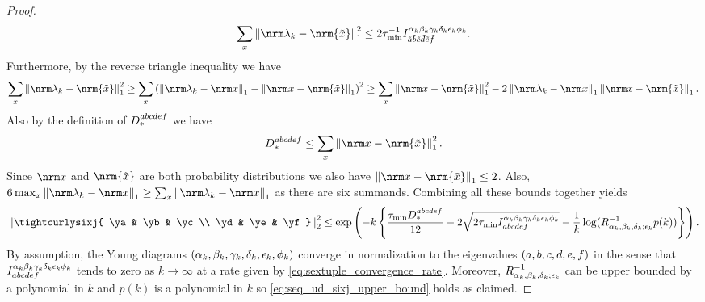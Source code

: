 \documentclass[notitlepage, 10pt]{article}
\begin{document}
\begin{proof}
    \begin{equation}
        \sum_{\ex} \norm{\nrm \yx_k - \nrm {\tilde \ex}}_{1}^2 \leq 2 \tau_{\min}^{-1}I^{\ya_k\yb_k\yc_k\yd_k\ye_k\yf_k}_{\tilde \ea \tilde \eb\tilde \ec\tilde \ed\tilde \ee\tilde \ef}.
    \end{equation}
    Furthermore, by the reverse triangle inequality we have
    \begin{align}
        \sum_{\ex} \norm{\nrm \yx_k - \nrm {\tilde \ex}}_{1}^2
        \geq
        \sum_{\ex}\left(\norm{\nrm \yx_k - \nrm \ex}_{1}
        -\norm{\nrm \ex - \nrm {\tilde \ex}}_{1}\right)^2
        \geq
        \sum_{\ex}\norm{\nrm \ex - \nrm {\tilde \ex}}_{1}^2 -2\norm{\nrm \yx_k - \nrm \ex}_{1}\norm{\nrm \ex - \nrm {\tilde \ex}}_{1}.
    \end{align}
    Also by the definition of $D_{*}^{abcdef}$ we have
    \begin{equation}
        D_{*}^{\ea\eb\ec\ed\ee\ef} \leq \sum_{\ex}\norm{\nrm \ex - \nrm {\tilde \ex}}_{1}^2.
    \end{equation}
    Since $\nrm \ex$ and $\nrm {\tilde \ex}$ are both probability distributions we also have $\norm{\nrm \ex - \nrm {\tilde \ex}}_{1} \leq 2$.
    Also, $6 \max_{\ex}\norm{\nrm \yx_k - \nrm \ex}_{1} \geq \sum_{\ex}\norm{\nrm \yx_k - \nrm \ex}_{1}$ as there are six summands.
    Combining all these bounds together yields
    \begin{equation}
        \norm{\tightcurlysixj{ \ya & \yb & \yc \\ \yd & \ye & \yf}}_{2}^2
        \leq  \exp\left(-k\left\{\frac{\tau_{\min} D_{*}^{\ea\eb\ec\ed\ee\ef}}{12}
        -2\sqrt{2 \tau_{\min} I_{\ea\eb\ec\ed\ee\ef}^{\ya_k\yb_k\yc_k\yd_k\ye_k\yf_k}} - \frac{1}{k}\log(R_{\ya_k,\yb_k,\yd_k;\ye_k}^{-1} p(k))\right\}\right).
    \end{equation}
    By assumption, the Young diagrams $(\alpha_k, \beta_k, \gamma_k, \delta_k, \epsilon_k, \phi_k)$ converge in normalization to the eigenvalues $(a,b,c,d,e,f)$ in the sense that $I_{abcdef}^{\alpha_k\beta_k\gamma_k\delta_k\epsilon_k\phi_k}$ tends to zero as $k\to \infty$ at a rate given by \cref{eq:sextuple_convergence_rate}.
    Moreover, $R_{\alpha_k,\beta_k,\delta_k;\epsilon_k}^{-1}$ can be upper bounded by a polynomial in $k$ and $p(k)$ is a polynomial in $k$ so \cref{eq:seq_ud_sixj_upper_bound} holds as claimed.
\end{proof}
\end{document}
